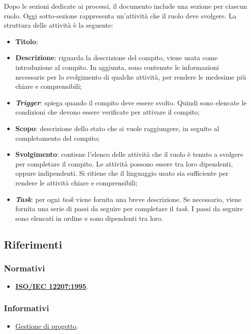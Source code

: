 Dopo le sezioni dedicate ai processi, il documento include una sezione per
ciascun ruolo. Oggi sotto-sezione rappresenta un'attività che il ruolo deve
svolgere.  La struttura delle attività è la seguente:
\begin{itemize}
	\item \textbf{Titolo};

	\item \textbf{Descrizione}: riguarda la descrizione del compito, viene usata
	      come introduzione al compito. In aggiunta, sono contenute le
	      informazioni necessarie per lo svolgimento di qualche attività, per
	      rendere le medesime più chiare e comprensibili;

	\item \textbf{\textit{Trigger}}: spiega quando il compito deve essere
	      svolto. Quindi sono elencate le condizioni che devono essere
	      verificate per attivare il compito;

	\item \textbf{Scopo}: descrizione dello stato che si vuole raggiungere, in
	      seguito al completamento del compito;

	\item \textbf{Svolgimento}: contiene l'elenco delle attività che il ruolo è
	      tenuto a svolgere per completare il compito. Le attività possono
	      essere tra loro dipendenti, oppure indipendenti. Si ritiene che il
	      linguaggio usato sia sufficiente per rendere le attività chiare e
	      comprensibili;

	\item \textbf{\textit{Task}}: per ogni \textit{task} viene fornita una
	      breve descrizione. Se necessario, viene fornita una serie di passi da
	      seguire per completare il \textit{task}. I passi da seguire sono
	      elencati in ordine e sono dipendenti tra loro.
\end{itemize}

\subsection{Riferimenti}
\subsubsection{Normativi}
\begin{itemize}
	\item \href{https://www.math.unipd.it/~tullio/IS-1/2009/Approfondimenti/ISO_12207-1995.pdf}{\textbf{ISO/IEC 12207:1995}}.
\end{itemize}

\subsubsection{Informativi}
\begin{itemize}
	\item \href{https://www.math.unipd.it/~tullio/IS-1/2023/Dispense/T4.pdf}{Gestione di progetto}.
\end{itemize}
